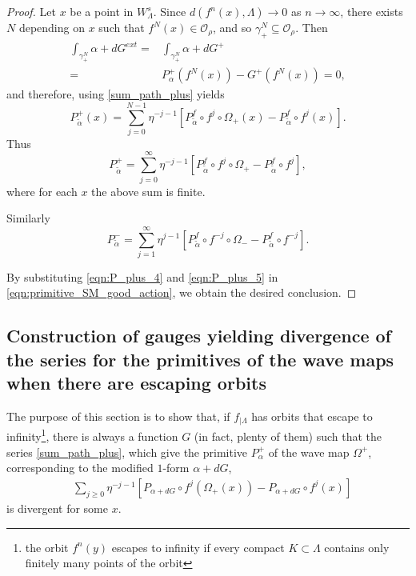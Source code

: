 \documentclass[11pt]{amsart}
\theoremstyle{definition}
\theoremstyle{remark}
\numberwithin{equation}{section}
\newcommand{\OO}{\mathcal{O}}
\begin{document}
\begin{proof}
Let $x$ be a point in $W^s_\Lambda$. Since $d(f^n(x),\Lambda)\to 0$ as $n\to\infty$, there exists $N$ depending on $x$ such that $f^N(x)\in \OO_\rho$, and so $\gamma^N_+\subseteq  \OO_\rho$.
Then
\begin{equation}\label{eqn:Gext_cancellation}
  \begin{split}
\int_{\gamma^N_+}\alpha+dG^{ext}=&\int_{\gamma^N_+}\alpha+dG^+\\
=&P^+_\alpha(f^N(x))-G^+(f^N(x))=0,
\end{split}
\end{equation}
and therefore, using \eqref{sum_path_plus} yields
\begin{equation}\label{eqn:P_plus_3}
P^+_{\tilde\alpha}(x)= \sum_{j=0}^{N-1}\eta^{-j-1}[P^f_{\tilde\alpha}\circ f^j\circ \Omega_+(x) -P^f_{\tilde\alpha}\circ f^j(x)].
\end{equation}
Thus
\begin{equation}\label{eqn:P_plus_4}
   P^+_{\tilde\alpha} = \sum_{j=0}^{\infty}\eta^{-j-1}[P^f_{\tilde\alpha}\circ f^j\circ \Omega_+ -P^f_{\tilde\alpha}\circ f^j],
\end{equation}
where for each $x$ the above sum is finite.

Similarly
\begin{equation}\label{eqn:P_plus_5}
   P^-_{\tilde\alpha} = \sum_{j=1}^{\infty}\eta^{j-1}[P^f_{\tilde\alpha}\circ f^{-j}\circ \Omega_- -P^f_{\tilde\alpha}\circ f^{-j}].
\end{equation}

By substituting \eqref{eqn:P_plus_4} and  \eqref{eqn:P_plus_5} in \eqref{eqn:primitive_SM_good_action}, we obtain the desired conclusion.
\end{proof}

\subsection{Construction of gauges yielding  divergence of the series for the primitives  of the wave maps  when there are escaping orbits
}\label{divergence}

The purpose of this section is to show that, if  $f_{\mid\Lambda}$ has orbits that escape to infinity\footnote{the orbit $f^n(y)$ escapes to infinity if
every compact $K \subset \Lambda$ contains only finitely many points of the orbit}, there is always a function $G$ (in fact, plenty of them) such that the series \eqref{sum_path_plus}, which give the primitive $P_\alpha^+$ of the wave map $\Omega^+$, corresponding to the modified $1$-form $\alpha+dG$,
\begin{equation}\label{eqn:series0}
\begin{split}
&\sum_{j\ge 0}\eta^{-j-1}[P_{\alpha+dG}\circ f^j(\Omega_+(x))-P_{\alpha+dG}\circ f^j(x)]
\end{split}
\end{equation}
is divergent for some $x$.
\end{document}
